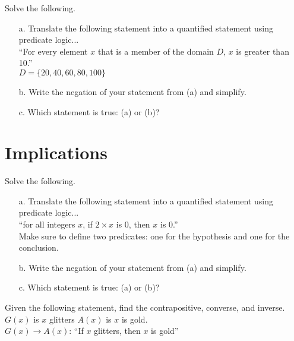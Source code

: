         \begin{questionNOGRADE}{\thequestion}
            Solve the following.

            \begin{itemize}
                \item[a.]   Translate the following statement into a quantified statement using predicate logic...\\
                ``For every element $x$ that is a member of the domain $D$, $x$ is greater than 10.'' \\
                $D = \{20, 40, 60, 80, 100 \}$

                \item[b.]   Write the negation of your statement from (a) and simplify.

                \item[c.]   Which statement is true: (a) or (b)?
            \end{itemize}
        \end{questionNOGRADE}

    \section{Implications}
    
        \begin{questionNOGRADE}{\thequestion}
            Solve the following.

            \begin{itemize}
                \item[a.]   Translate the following statement into a quantified statement using predicate logic...\\
                ``for all integers $x$, if $2 \times x$ is 0, then $x$ is 0.'' \\
                Make sure to define two predicates: one for the hypothesis and one for the conclusion.

                \item[b.]   Write the negation of your statement from (a) and simplify.

                \item[c.]   Which statement is true: (a) or (b)?
            \end{itemize}
        \end{questionNOGRADE}
    
        \begin{questionNOGRADE}{\thequestion}
            Given the following statement, find the contrapositive, converse, and inverse. \\
            $G(x)$ is $x$ glitters  \tab $A(x)$ is $x$ is gold. \\
            $G(x) \to A(x)$:    \tab ``If $x$ glitters, then $x$ is gold''
        \end{questionNOGRADE}

